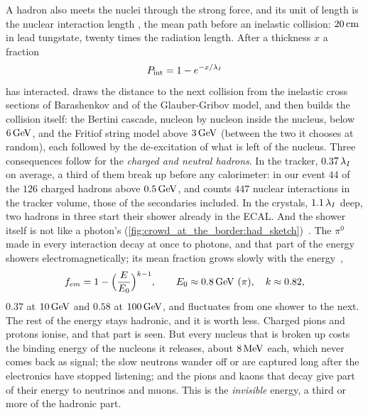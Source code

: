 A hadron also meets the nuclei through the strong force, and its unit of
length is the nuclear interaction length \lamI, the mean path before an
inelastic collision: $20\,\mathrm{cm}$ in lead tungstate, twenty times the radiation
length. After a thickness $x$ a fraction
\begin{equation}
  P_{\mathrm{int}}=1-e^{-x/\lambda_I}
  \label{eq:crowd_at_the_border:lambda}
\end{equation}
has interacted. \GEANT draws the distance to the next collision from the
inelastic cross sections of Barashenkov and of the Glauber-Gribov model,
and then builds the collision itself: the Bertini cascade, nucleon by
nucleon inside the nucleus, below $6\,\mathrm{GeV}$, and the Fritiof string model
above $3\,\mathrm{GeV}$ (between the two it chooses at random), each followed by the
de-excitation of what is left of the nucleus. Three consequences follow for
the \emph{charged and neutral hadrons}. In the tracker,
$0.37\,\lambda_I$ on average, a third of them break up before any
calorimeter: in our event $44$ of the
$126$ charged hadrons above
$0.5\,\mathrm{GeV}$, and \GEANT counts $447$ nuclear interactions in the
tracker volume, those of the secondaries included. In the crystals,
$1.1\,\lambda_I$ deep, two hadrons in three start their shower already in the
ECAL. And the shower itself is not like a photon's
(\cref{fig:crowd_at_the_border:had_sketch})~\cite{Wigmans:2000vf,Fabjan:2003aq}.
The $\pi^0$ made in every interaction decay at once to photons, and that
part of the energy showers electromagnetically; its mean fraction grows
slowly with the energy~\cite{Gabriel:1993ai,Groom:2006am},
\begin{equation}
  f_{em}=1-\Big(\frac{E}{E_0}\Big)^{k-1},\qquad E_0\approx0.8\,\mathrm{GeV}\ (\pi),\quad k\approx0.82 ,
  \label{eq:crowd_at_the_border:fem}
\end{equation}
$0.37$ at $10\,\mathrm{GeV}$ and $0.58$ at $100\,\mathrm{GeV}$, and fluctuates from one shower
to the next. The rest of the energy stays hadronic, and it is worth less.
Charged pions and protons ionise, and that part is seen. But every nucleus
that is broken up costs the binding energy of the nucleons it releases,
about $8\,\mathrm{MeV}$ each, which never comes back as signal; the slow neutrons
wander off or are captured long after the electronics have stopped
listening; and the pions and kaons that decay give part of their energy to
neutrinos and muons. This is the \emph{invisible} energy, a third or more
of the hadronic part.

